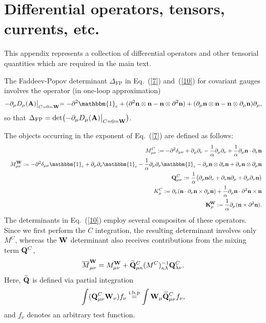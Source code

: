 \documentclass[a4paper,12pt]{article}
\newcommand{\re}[1]{~(\ref{#1})}
\begin{document}
\section{Differential operators, tensors, currents, etc.}

This appendix represents a collection of differential operators and
other tensorial quantities which are required in the main text. 

The Faddeev-Popov determinant $\Delta_{\text{FP}}$ in Eq.\re{7}
and\re{10} for covariant gauges involves the operator (in one-loop
approximation)
\begin{equation}
-\partial_\mu D_\mu(\mA)\bigl|_{C=0=\mW}
 =-\partial^2\mathbbm{1}_{\text{c}} 
 +(\partial^2\mn\otimes\mn -\mn\otimes\partial^2\mn)
 +(\partial_\mu\mn\otimes\mn-\mn\otimes\partial_\mu\mn)
 \partial_\mu, \label{A0}
\end{equation}
so that $\Delta_{\text{FP}}= \det \bigl(-\partial_\mu
D_\mu(\mathbf{A})\bigl|_{C=0=\mathbf{W}} \bigr)$.

The objects occurring in the exponent of Eq.\re{7} are defined as
follows:
\begin{eqnarray}
&&M^C_{\mu\nu}:= -\partial^2 \delta_{\mu\nu} +\partial_\mu
\partial_\nu -\frac{1}{\alpha} \partial_\mu \partial_\nu
+\frac{1}{\alpha} \partial_\mu\mn \cdot \partial_\nu \mn\nonumber\\
&&M^{\mW}_{\mu\nu} := -\partial^2 \delta_{\mu\nu}
\mathbbm{1}_{\text{c}}+\partial_\mu \partial_\nu\mathbbm{1}_{\text{c}}
-\frac{1}{\alpha} \partial_\mu \partial_\nu\mathbbm{1}_{\text{c}}
 -\partial_\mu \mn \otimes \partial_\nu \mn + \partial_\nu \mn \otimes
 \partial_\mu \mn\nonumber\\
&&\mQ^{C}_{\mu\nu}:= \frac{1}{\alpha} \bigl( \partial_\mu\mn
\partial_\nu +\partial_\nu \mn \partial_\mu +\partial_\mu\partial_\nu
\mn\bigr)\nonumber\\
&&K^C_\mu:=\partial_\nu (\mn\cdot \partial_\nu \mn \times
\partial_\mu \mn) + \frac{1}{\alpha} \partial_\mu\mn\cdot
\partial^2\mn\times \mn \nonumber\\
&&\mK_\mu := \frac{1}{\alpha} \partial_\mu(\mn \times \partial^2
\mn).  \label{A1}
\end{eqnarray}
The determinants in Eq.\re{10} employ several composites of these
operators. Since we first perform the $C$ integration, the resulting
determinant involves only $M^C$, whereas the $\mathbf{W}$ determinant also
receives contributions from the mixing term $\mathbf{Q}^C$,
\begin{equation}
\overline{M}^{\mathbf{W}}_{\mu\nu}={M}^{\mathbf{W}}_{\mu\nu}+\widetilde{\mathbf{Q}}^C_{\mu\kappa}
(M^C)^{-1}_{\kappa\lambda} \mathbf{Q}^C_{\lambda\nu}. \label{A2}
\end{equation}
Here, $\widetilde{\mathbf{Q}}$ is defined via partial integration
\begin{equation}
\int (\mathbf{Q}^C_{\mu\nu} \mathbf{W}_\nu) f_\nu\stackrel{\text{i.b.p}}{=} \int
\mathbf{W}_\mu \widetilde{\mathbf{Q}}^C_{\mu\nu} f_\nu, \label{A3}
\end{equation} 
and $f_\nu$ denotes an arbitrary test function. 
\end{document}
